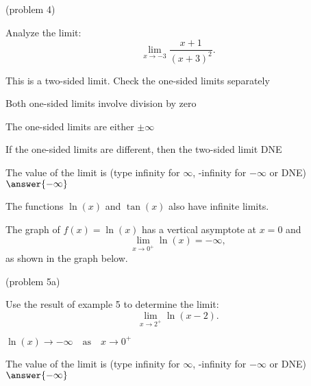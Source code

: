 \documentclass[handout]{ximera}
\begin{document}
\begin{problem}(problem 4)
  
	Analyze the limit:
  \[
  \lim_{x \to -3} \frac{x+1}{(x+3)^2}.
  \]
  
    \begin{hint}
      This is a two-sided limit. Check the one-sided limits separately
    \end{hint}
    \begin{hint}
      Both one-sided limits involve division by zero
    \end{hint}
    \begin{hint}
      The one-sided limits are either $\pm \infty$
    \end{hint}
		\begin{hint}
		  If the one-sided limits are different, then the two-sided limit DNE
		\end{hint}	
		The value of the limit is
		(type infinity for $\infty$, -infinity for $-\infty$ or DNE)
		 $\answer{-\infty}$
		
		
\end{problem}

The functions $\ln(x)$ and $\tan(x)$ also have infinite limits.

\begin{example}[example 5]
The graph of $f(x) = \ln(x)$ has a vertical asymptote at $x=0$
and 
\[
\lim_{x\to 0^+} \ln(x) = -\infty,
\]
as shown in the graph below.


\begin{center}
\end{center}


\end{example}


\begin{problem}(problem 5a)
  
	Use the result of example 5 to determine the limit:
  \[
  \lim_{x \to {2^+}} \ln(x-2).
  \]
		\begin{hint}
		  $\ln(x) \to -\infty \quad \text{as} \quad x \to 0^+$
		\end{hint}	
		The value of the limit is
		(type infinity for $\infty$, -infinity for $-\infty$ or DNE)
		 $\answer{-\infty}$
		
\end{problem}
\end{document}
